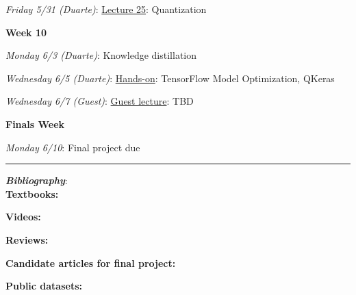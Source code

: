 \documentclass[12pt]{article}
\begin{document}
\emph{Friday 5/31 (Duarte)}: \underline{Lecture 25}: Quantization

\noindent\textbf{Week 10}

\emph{Monday 6/3 (Duarte)}: Knowledge distillation

\emph{Wednesday 6/5 (Duarte)}: \underline{Hands-on}: TensorFlow Model Optimization, QKeras

\emph{Wednesday 6/7 (Guest)}: \underline{Guest lecture}: TBD

\noindent\textbf{Finals Week}

\emph{Monday 6/10}: Final project due

\begin{center}
	\rule{\textwidth}{0.5pt}
\end{center}

\noindent\textbf{\emph{Bibliography}}:\\

\textbf{Textbooks:}

\newrefsection
\nocite{Mehta:2019,Abu-Mostafa:2012,Erdman:2021,Zeljko:2014,Calafiura:2022,Chollet:2021,Goodfellow-et-al-2016}
\printbibliography[heading=none]

\textbf{Videos:}

\newrefsection
\nocite{3blue1brown_neuralnetwork,3blue1brown_gradientdescent}
\printbibliography[heading=none]

\textbf{Reviews:}

\newrefsection
\nocite{Carleo:2019ptp,hepmllivingreview}
\printbibliography[heading=none]

\textbf{Candidate articles for final project:}

\newrefsection
\nocite{deOliveira:2015xxd,Aurisano:2016jvx,Komiske:2016rsd,Khan:2018opv,Zhou:2019,Moreno:2019neq,Ormiston:2020ele,Moreno:2021fvp,Erdmann:2019nie,Guest:2016iqz,Majorana:2023kmv}
\printbibliography[heading=none]

\textbf{Public datasets:}

\newrefsection
\nocite{kasieczka_gregor_2019_2603256,hbb_dataset,galaxy-zoo-the-galaxy-challenge,g2net-gravitational-wave-detection,trackml-particle-identification,majorana_collaboration_2023_8257027}
\printbibliography[heading=none]
\end{document}
